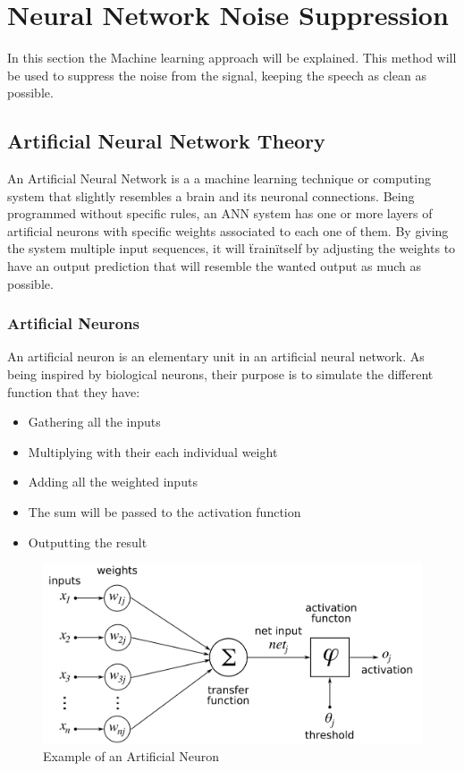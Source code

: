 \chapter{Neural Network Noise Suppression}\label{NeuralNetworkNoiseSuppression}
In this section the Machine learning approach will be explained.
This method will be used to suppress the noise from the signal, keeping the speech as clean as possible.

\section{Artificial Neural Network Theory}

An Artificial Neural Network is a a machine learning technique or computing system that slightly resembles a brain and its neuronal connections. Being programmed without specific rules, an ANN system has one or more layers of artificial neurons with specific weights associated to each one of them. By giving the system multiple input sequences, it will \"train\" itself by adjusting the weights to have an output prediction that will resemble the wanted output as much as possible.

\subsection{Artificial  Neurons}

An artificial neuron is an elementary unit in an artificial neural network. As being inspired by biological neurons, their purpose is to simulate the different function that they have:
\begin{itemize}
\item Gathering all the inputs
\item Multiplying with their each individual weight
\item Adding all the weighted inputs
\item The sum will be passed to the activation function
\item Outputting the result
\end{itemize}

\begin{figure}[htp]
	\centering
	\includegraphics[width=1\textwidth]{Illustrations/artificialneuron.png}
	\caption{Example of an Artificial Neuron}
	\label{fig:ArtificialNeuron}
\end{figure}

